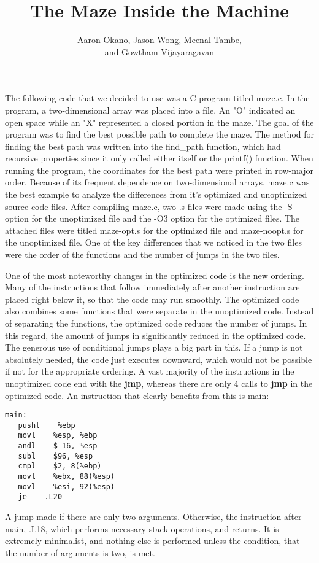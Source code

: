 \documentclass[12pt,letterpaper]{article}
\title{The Maze Inside the Machine}
\author{Aaron Okano, Jason Wong, Meenal Tambe, \\ and Gowtham Vijayaragavan}
\begin{document}
\setcounter{page}{1}
\maketitle

The following code that we decided to use was a C program titled maze.c. In the program, a two-dimensional array was placed into a file. An "O" indicated an open space while an "X" represented a closed portion in the maze. The goal of the program was to find the best possible path to complete the maze. The method for finding the best path was written into the find\_path function, which had recursive properties since it only called either itself or the printf() function. When running the program, the coordinates for the best path were printed in row-major order. Because of its frequent dependence on two-dimensional arrays, maze.c was the best example to analyze the differences from it's optimized and unoptimized source code files.
After compiling maze.c, two .s files were made using the -S option for the unoptimized file and the -O3 option for the optimized files. The attached files were titled maze-opt.s for the optimized file and maze-noopt.s for the unoptimized file. One of the key differences that we noticed in the two files were the order of the functions and the number of jumps in the two files.

One of the most noteworthy changes in the optimized code is the new ordering. Many of the instructions that follow immediately after another instruction are placed right below it, so that the code may run smoothly. The optimized code also combines some functions that were separate in the unoptimized code. Instead of separating the functions, the optimized code reduces the number of jumps. In this regard, the amount of jumps in significantly reduced in the optimized code. The generous use of conditional jumps plays a big part in this. If a jump is not absolutely needed, the code just executes downward, which would not be possible if not for the appropriate ordering. A vast majority of the instructions in the unoptimized code end with the {\bf jmp}, whereas there are only 4 calls to {\bf jmp} in the optimized code. An instruction that clearly benefits from this is main:
\begin{verbatim}
main:
   pushl    %ebp
   movl    %esp, %ebp
   andl    $-16, %esp
   subl    $96, %esp
   cmpl    $2, 8(%ebp)
   movl    %ebx, 88(%esp)
   movl    %esi, 92(%esp)
   je    .L20
\end{verbatim}
A jump made if there are only two arguments. Otherwise, the instruction after main, .L18, which performs necessary stack operations, and returns. It is extremely minimalist, and nothing else is performed unless the condition, that the number of arguments is two, is met.
\end{document}
